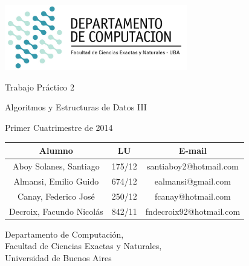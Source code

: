 \documentclass[a4paper, 10pt, twoside]{article}
\begin{document}

\thispagestyle{caratula}

\begin{center}

\includegraphics[width=0.6\textwidth]{./img/DC.jpg} 
\hfill

\vspace{2cm}

\begin{Huge}
Trabajo Práctico 2
\end{Huge}

\vspace{0.5cm}

\begin{Large}
Algoritmos y Estructuras de Datos III
\end{Large}

\vspace{1cm}

\begin{Large}
Primer Cuatrimestre de 2014
\end{Large}

\vspace{2cm}

\begin{tabular}{|c|c|c|}
\hline
Alumno & LU & E-mail\\
\hline
Aboy Solanes, Santiago    & 175/12 & santiaboy2@hotmail.com\\
Almansi, Emilio Guido     & 674/12 & ealmansi@gmail.com\\
Canay, Federico José      & 250/12 & fcanay@hotmail.com\\
Decroix, Facundo Nicolás  & 842/11 & fndecroix92@hotmail.com\\
\hline
\end{tabular}

\vspace{4cm}

Departamento de Computación,\\
Facultad de Ciencias Exactas y Naturales,\\
Universidad de Buenos Aires

\end{center}
\end{document}

